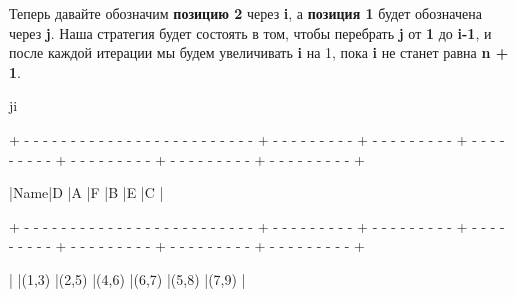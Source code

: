 \vspace{\baselineskip}
Теперь давайте обозначим {\bfseries позицию 2} через {\bfseries i}, а {\bfseries позиция 1} будет обозначена через {\bfseries j}. Наша стратегия будет состоять в том, чтобы перебрать {\bfseries j} от {\bfseries 1} до {\bfseries i-1}, и после каждой итерации мы будем увеличивать {\bfseries i} на 1, пока {\bfseries i} не станет равна {\bfseries n + 1}. 

\vspace{\baselineskip}
\begin{tcolorbox}
\hspace{56mm}j\hspace{17.5mm}i

{\tiny{+ - - - - - - - - - - - - - - - - - - - - - - - - - + - - - - - - - - - + - - - - - - - - - + - - - - - - - - - + - - - - - - - - - + - - - - - - - - - + - - - - - - - - - +}}

\hspace{0.4mm}|\hspace{17.6mm}Name\hspace{17.6mm}|\hspace{6.57mm}D\hspace{6.57mm} |\hspace{6.57mm}A\hspace{6.57mm} |\hspace{6.57mm}F\hspace{6.57mm} |\hspace{6.57mm}B\hspace{6.57mm} |\hspace{6.57mm}E\hspace{6.57mm} |\hspace{6.8mm}C\hspace{6.8mm} |

{\tiny{+ - - - - - - - - - - - - - - - - - - - - - - - - - + - - - - - - - - - + - - - - - - - - - + - - - - - - - - - + - - - - - - - - - + - - - - - - - - - + - - - - - - - - - +}}

\hspace{0.4mm}|\hspace{0.7mm}
|\hspace{3.85mm}(1,3)\hspace{3.85mm} |\hspace{3.85mm}(2,5)\hspace{3.85mm} |\hspace{3.85mm}(4,6)\hspace{3.85mm} |\hspace{3.85mm}(6,7)\hspace{3.85mm} |\hspace{3.85mm}(5,8)\hspace{3.85mm} |\hspace{3.85mm}(7,9)\hspace{3.85mm} |


\end{tcolorbox}
